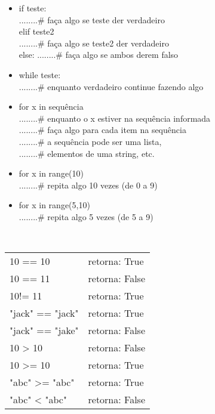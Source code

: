 \documentclass[landscape,a0paper,fontscale=0.285]{baposter} %
\newcommand{\compresslist}{ %
\setlength{\itemsep}{1pt}
\setlength{\parskip}{0pt}
\setlength{\parsep}{0pt}
}
\begin{document}
\begin{poster}
{%
\colorbox[HTML]{CCFFFF}{}
\begin{itemize}\compresslist
\item if teste:\\
........\# faça algo se teste der verdadeiro\\
elif teste2\\
........\# faça algo se teste2 der verdadeiro\\
else:\newline
........\# faça algo se ambos derem falso
\end{itemize}


\colorbox[HTML]{CCFFFF}{}
\begin{itemize}\compresslist
\item while teste:\\
........\# enquanto verdadeiro continue fazendo algo
\end{itemize}


\colorbox[HTML]{CCFFFF}{}
\begin{itemize}\compresslist
\item for x in sequência\\
........\# enquanto o x estiver na sequência informada\\
........\# faça algo para cada item na sequência\\
........\# a sequência pode ser uma lista,\\
........\# elementos de uma string, etc.

\item for x in range(10)\\
........\# repita algo 10 vezes (de 0 a 9)

\item for x in range(5,10)\\
........\# repita algo 5 vezes (de 5 a 9)
\end{itemize}

\colorbox[HTML]{CCFFFF}{}
\linebreak \\
\begin{tabular}{l l}
10 == 10 & retorna: True \\
10 == 11 & retorna: False \\
10!= 11 & retorna: True \\
"jack" == "jack" & retorna: True \\
"jack" == "jake" & retorna: False \\
10 > 10 & retorna: False \\
10 >= 10 & retorna: True \\
"abc" >= "abc" & retorna: True \\
"abc" < "abc" & retorna: False \\
\end{tabular}
}



\end{poster}
\end{document}
